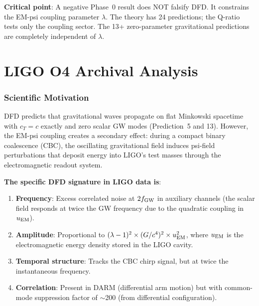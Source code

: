 \documentclass[11pt]{article}
\begin{document}
\textbf{Critical point}: A negative Phase~0 result does NOT falsify DFD.
It constrains the EM-psi coupling parameter $\lambda$. The theory has
24 predictions; the Q-ratio tests only the coupling sector. The 13+
zero-parameter gravitational predictions are completely independent of
$\lambda$.


\part{LIGO O4 Archival Analysis}
\label{part:ligo}

\section{Scientific Motivation}
\label{sec:ligo-motivation}

DFD predicts that gravitational waves propagate on flat Minkowski
spacetime with $c_T = c$ exactly and zero scalar GW modes (Prediction~5
and 13). However, the EM-psi coupling creates a secondary effect: during
a compact binary coalescence (CBC), the oscillating gravitational
field induces psi-field perturbations that deposit energy into LIGO's
test masses through the electromagnetic readout system.

\textbf{The specific DFD signature in LIGO data is}:
\begin{enumerate}[nosep]
\item \textbf{Frequency}: Excess correlated noise at $2f_{\rm GW}$
  in auxiliary channels (the scalar field responds at twice the GW
  frequency due to the quadratic coupling in $u_{\rm EM}$).
\item \textbf{Amplitude}: Proportional to $(\lambda-1)^2 \times
  (G/c^4)^2 \times u_{\rm EM}^2$, where $u_{\rm EM}$ is the
  electromagnetic energy density stored in the LIGO cavity.
\item \textbf{Temporal structure}: Tracks the CBC chirp signal,
  but at twice the instantaneous frequency.
\item \textbf{Correlation}: Present in DARM (differential arm
  motion) but with common-mode suppression factor of $\sim$200
  (from differential configuration).
\end{enumerate}
\end{document}
